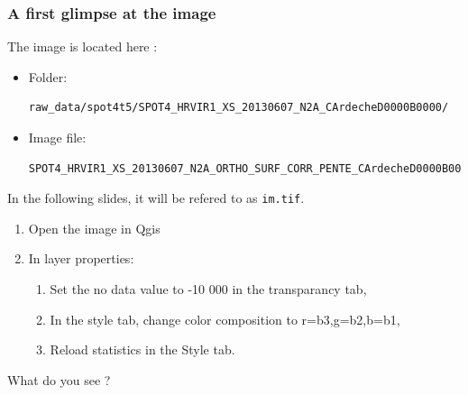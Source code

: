 \documentclass[8pt]{beamer}
\begin{document}
\begin{frame}[fragile]

\frametitle{A first glimpse at the image}

The image is located here :

\begin{itemize}
\item Folder: \begin{scriptsize}\begin{verbatim}raw_data/spot4t5/SPOT4_HRVIR1_XS_20130607_N2A_CArdecheD0000B0000/\end{verbatim}\end{scriptsize}
\item Image file: \begin{scriptsize}\begin{verbatim}SPOT4_HRVIR1_XS_20130607_N2A_ORTHO_SURF_CORR_PENTE_CArdecheD0000B0000.TIF\end{verbatim}\end{scriptsize}
\end{itemize}

In the following slides, it will be refered to as \texttt{im.tif}.

\begin{enumerate}
\item Open the image in Qgis
\item In layer properties:
  \begin{enumerate}
    \item Set the no data value to -10 000 in the transparancy tab,
    \item In the style tab, change color composition to r=b3,g=b2,b=b1,
    \item Reload statistics in the Style tab.
  \end{enumerate}
\end{enumerate}
What do you see ?
\end{frame}
\end{document}
